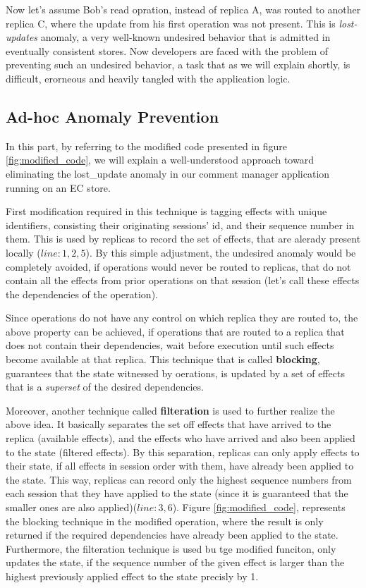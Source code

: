 Now let's assume Bob's read opration, instead of replica A, was routed
to another replica C, where the update from his first operation was not
present. This is \emph{lost-updates} anomaly, a very well-known
undesired behavior that is admitted in eventually consistent stores. 
Now developers are faced with the problem of preventing such an undesired
behavior, a task that as we will explain shortly, is difficult,
erorneous and heavily tangled with the application logic.
%
%
\subsection{Ad-hoc Anomaly Prevention}
In this part, by referring to the modified code  presented in figure
\ref{fig:modified_code}, we will
explain a well-understood approach toward eliminating the lost\_update anomaly in
our comment manager application running on an EC store.

First modification required in this technique is tagging effects with
unique identifiers, consisting their originating sessions' id, and their
sequence number in them. This is used by replicas to
record the set of effects, that are alerady present locally
($line:1,2,5$). By this simple adjustment, the undesired anomaly would
be completely avoided, if operations would never be routed to replicas,
that do not contain all the effects from prior operations on that
session (let's call these effects the dependencies of
the operation). 

Since operations do not have any control on which replica they are
routed to, the above property can be achieved, if operations that are
routed to a replica that does not contain their dependencies, wait
before execution until such effects become available at that replica.
This technique that is called {\bf blocking}, guarantees that the state
witnessed by oerations, 
is updated by a set of effects that is a \emph{superset} of the desired
dependencies.

Moreover, another technique called {\bf filteration} is used to further realize
the above idea. It basically separates the set off effects that have
arrived to the replica (available effects), and the effects who have
arrived and also been applied to the state (filtered effects).
By this separation, replicas can only apply effects to their state, if all
effects in session order with them, have already been applied to the
state. 
This way, replicas can record only the highest sequence
numbers from each session that they have applied to the state (since it
is guaranteed that the smaller ones are also applied)($line:3,6$). 
Figure \ref{fig:modified_code}, represents the blocking technique in the modified \readC{}
operation, where the result is only returned if the required
dependencies have already been applied to the state. Furthermore, the
filteration technique is used bu tge modified \applyC{} funciton, only
updates the state, if the sequence number of the given effect is
larger than the highest previously applied effect to the state precisly
by 1.


